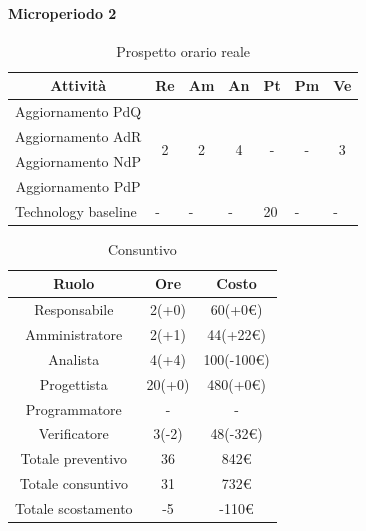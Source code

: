 \paragraph{Microperiodo 2}
\begin{table}[H]
	\centering
	\begin{tabular}{|c|c|c|c|c|c|c|}
		\hline
		\rowcolor{lighter-grayer}
		\textbf{Attività}                         & \textbf{Re}            & \textbf{Am}            & \textbf{An}            & \textbf{Pt}             & \textbf{Pm}            & \textbf{Ve}            \\ \hline
		Aggiornamento PdQ                         & \multirow{4}{*}{2}     & \multirow{4}{*}{2}     & \multirow{4}{*}{4}     & \multirow{4}{*}{-}      & \multirow{4}{*}{-}     & \multirow{4}{*}{3}     \\ \cline{1-1}
		Aggiornamento AdR                         &                        &                        &                        &                         &                        &                        \\ \cline{1-1}
		Aggiornamento NdP                         &                        &                        &                        &                         &                        &                        \\ \cline{1-1}
		Aggiornamento PdP                         &                        &                        &                        &                         &                        &                        \\ \hline
		\multicolumn{1}{|l|}{Technology baseline} & \multicolumn{1}{l|}{-} & \multicolumn{1}{l|}{-} & \multicolumn{1}{l|}{-} & \multicolumn{1}{l|}{20} & \multicolumn{1}{l|}{-} & \multicolumn{1}{l|}{-} \\ \hline
	\end{tabular}
\caption{ Prospetto orario reale\\}
\end{table}

\begin{table}[H]
	\centering
	\renewcommand{\arraystretch}{1.5}
	\begin{tabular}{|c|c|c|}
		\hline
		\rowcolor{lighter-grayer}
		Ruolo & Ore & Costo \\ \hline
		Responsabile & 2(+0) & 60(+0\euro) \\ \hline
		Amministratore & 2(+1) & 44(+22\euro) \\ \hline
		Analista & 4(+4) & 100(-100\euro) \\ \hline
		Progettista & 20(+0) & 480(+0\euro) \\ \hline
		Programmatore & - & - \\ \hline
		Verificatore & 3(-2) & 48(-32\euro) \\ \hline
		Totale preventivo & 36 & 842\euro \\ \hline
		Totale consuntivo & 31 & 732\euro \\ \hline
		Totale scostamento & -5 & -110\euro \\ \hline
	\end{tabular}
	\caption{ Consuntivo\\}
\end{table}

